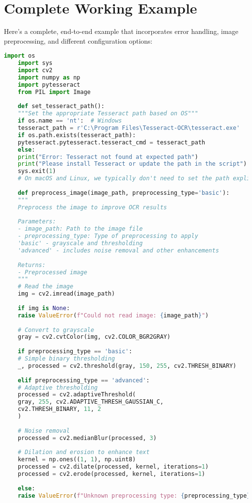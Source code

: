 \section{Complete Working Example}
Here's a complete, end-to-end example that incorporates error handling, image preprocessing, and different configuration options:

\begin{lstlisting}[language=Python]
	import os
	import sys
	import cv2
	import numpy as np
	import pytesseract
	from PIL import Image
	
	def set_tesseract_path():
	"""Set the appropriate Tesseract path based on OS"""
	if os.name == 'nt':  # Windows
	tesseract_path = r'C:\Program Files\Tesseract-OCR\tesseract.exe'
	if os.path.exists(tesseract_path):
	pytesseract.pytesseract.tesseract_cmd = tesseract_path
	else:
	print("Error: Tesseract not found at expected path")
	print("Please install Tesseract or update the path in the script")
	sys.exit(1)
	# On macOS and Linux, we typically don't need to set the path explicitly
	
	def preprocess_image(image_path, preprocessing_type='basic'):
	"""
	Preprocess the image to improve OCR results
	
	Parameters:
	- image_path: Path to the image file
	- preprocessing_type: Type of preprocessing to apply
	'basic' - grayscale and thresholding
	'advanced' - includes noise removal and other enhancements
	
	Returns:
	- Preprocessed image
	"""
	# Read the image
	img = cv2.imread(image_path)
	
	if img is None:
	raise ValueError(f"Could not read image: {image_path}")
	
	# Convert to grayscale
	gray = cv2.cvtColor(img, cv2.COLOR_BGR2GRAY)
	
	if preprocessing_type == 'basic':
	# Simple binary thresholding
	_, processed = cv2.threshold(gray, 150, 255, cv2.THRESH_BINARY)
	
	elif preprocessing_type == 'advanced':
	# Adaptive thresholding
	processed = cv2.adaptiveThreshold(
	gray, 255, cv2.ADAPTIVE_THRESH_GAUSSIAN_C, 
	cv2.THRESH_BINARY, 11, 2
	)
	
	# Noise removal
	processed = cv2.medianBlur(processed, 3)
	
	# Dilation and erosion to enhance text
	kernel = np.ones((1, 1), np.uint8)
	processed = cv2.dilate(processed, kernel, iterations=1)
	processed = cv2.erode(processed, kernel, iterations=1)
	
	else:
	raise ValueError(f"Unknown preprocessing type: {preprocessing_type}")
	

\end{lstlisting}
